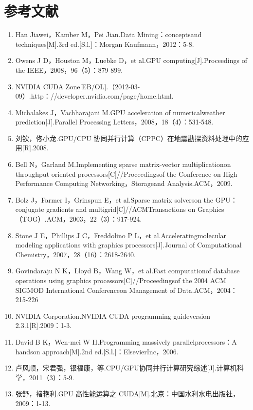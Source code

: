 \documentclass{article}
\begin{document}
    \section*{参考文献}
    \begin{enumerate}[labelsep = 0em, leftmargin = 10pt, itemindent = 0em]
        \item  Han Jiawei，Kamber M，Pei Jian.Data Mining：conceptsand techniques[M].3rd ed.[S.l.]：Morgan Kaufmann，2012：5-8.
        \item  Owens J D，Houston M，Luebke D，et al.GPU computing[J].Proceedings of the IEEE，2008，96（5）：879-899.
        \item  NVIDIA CUDA Zone[EB/OL].（2012-03-09）.http：//developer.nvidia.com/page/home.html.
        \item  Michalakes J，Vachharajani M.GPU acceleration of numericalweather prediction[J].Parallel Processing Letters，2008，18（4）：531-548.
        \item  刘钦，佟小龙.GPU/CPU 协同并行计算（CPPC）在地震勘探资料处理中的应用[R].2008.
        \item  Bell N，Garland M.Implementing sparse matrix-vector multiplicationon throughput-oriented processors[C]//Proceedingsof the Conference on High Performance Computing Networking，Storageand Analysis.ACM，2009.
        \item  Bolz J，Farmer I，Grinspun E，et al.Sparse matrix solverson the GPU：conjugate gradients and multigrid[C]//ACMTransactions on Graphics（TOG）.ACM，2003，22（3）：917-924.
        \item  Stone J E，Phillips J C，Freddolino P L，et al.Acceleratingmolecular modeling applications with graphics processors[J].Journal of Computational Chemistry，2007，28（16）：2618-2640.
        \item  Govindaraju N K，Lloyd B，Wang W，et al.Fast computationof database operations using graphics processors[C]//Proceedingsof the 2004 ACM SIGMOD International Conferenceon Management of Data.ACM，2004：215-226
        \item  NVIDIA Corporation.NVIDIA CUDA programming guideversion 2.3.1[R].2009：1-3.
        \item  David B K，Wen-mei W H.Programming massively parallelprocessors：A handson approach[M].2nd ed.[S.l.]：ElsevierInc，2006.
        \item  卢风顺，宋君强，银福康，等.CPU/GPU协同并行计算研究综述[J].计算机科学，2011（3）：5-9.
        \item  张舒，褚艳利.GPU 高性能运算之 CUDA[M].北京：中国水利水电出版社，2009：1-13.

\end{enumerate}
\end{document}
